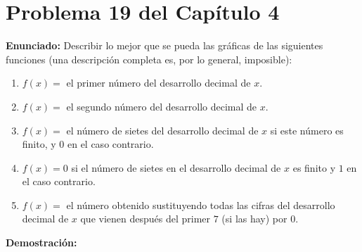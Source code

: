 \section*{Problema 19 del Capítulo 4}

\textbf{Enunciado:}
Describir lo mejor que se pueda las gráficas de las siguientes funciones (una descripción completa es, por lo general, imposible):

\begin{enumerate}
    \item $f(x) =$ el primer número del desarrollo decimal de $x$.
    \item $f(x) =$ el segundo número del desarrollo decimal de $x$.
    \item $f(x) =$ el número de sietes del desarrollo decimal de $x$ si este número es finito, y $0$ en el caso contrario.
    \item $f(x) = 0$ si el número de sietes en el desarrollo decimal de $x$ es finito y $1$ en el caso contrario.
    \item $f(x) =$ el número obtenido sustituyendo todas las cifras del desarrollo decimal de $x$ que vienen después del primer $7$ (si las hay) por $0$.
\end{enumerate}

\textbf{Demostración:}

